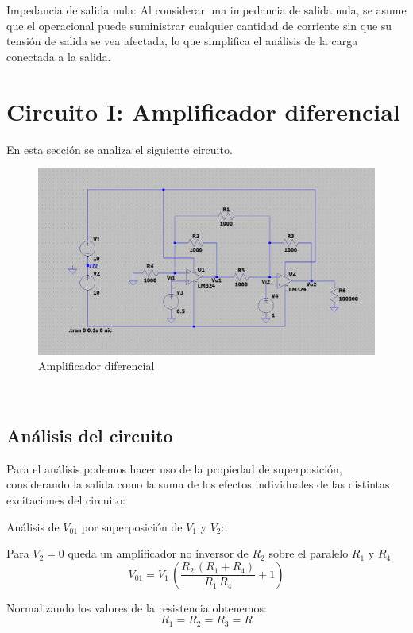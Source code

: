 \documentclass[12pt]{article}
\begin{document}
	Impedancia de salida nula: Al considerar una impedancia de salida nula, se asume que el operacional puede suministrar cualquier cantidad de corriente sin que su tensión de salida se vea afectada, lo que simplifica el análisis de la carga conectada a la salida.
	
	\section{Circuito I: Amplificador diferencial}
		
		En esta sección se analiza el siguiente circuito.
		\begin{figure}
			\centering
			\includegraphics[width=1\linewidth]{Simulaciones-Resultados/Circuito1_esquematico}
			\caption{Amplificador diferencial}
			\label{fig:circuito1esquematico}
		\end{figure} \\
		
		\subsection{Análisis del circuito}
		Para el análisis podemos hacer uso de la propiedad de superposición, considerando la salida como la suma de los
		efectos individuales de las distintas excitaciones del circuito:
		
		Análisis de $V_{01}$ por superposición de $V_1$ y $V_2$:
		
		Para $V_2=0$ queda un amplificador no inversor de $R_2$ sobre el paralelo $R_1$ y $R_4$
		\begin{equation}
			V_{01} = V_1 \,{\left(\frac{R_2 \,{\left(R_1 +R_4 \right)}}{R_1 \,R_4 }+1\right)}
		\end{equation}
		
		Normalizando los valores de la resistencia obtenemos:
		\begin{equation}
			R_1=R_2=R_3=R 
		\end{equation}
		
\end{document}
